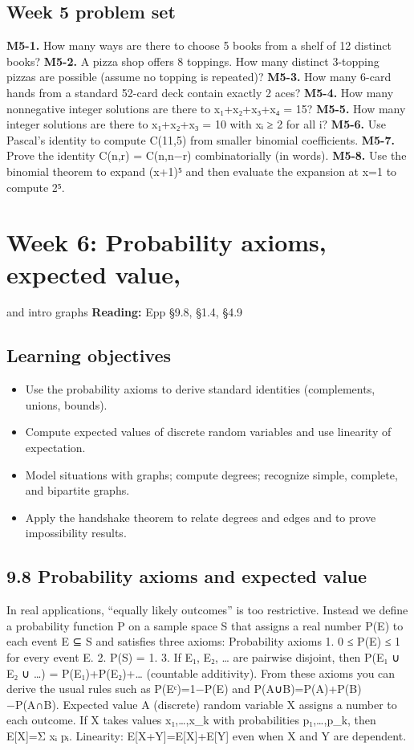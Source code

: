 \documentclass[11pt]{article}
\begin{document}
\subsection*{Week 5 problem set}
\textbf{M5-1.} How many ways are there to choose 5 books from a shelf of 12 distinct books?
\textbf{M5-2.} A pizza shop offers 8 toppings. How many distinct 3-topping pizzas are possible
(assume no topping is repeated)?
\textbf{M5-3.} How many 6-card hands from a standard 52-card deck contain exactly 2 aces?
\textbf{M5-4.} How many nonnegative integer solutions are there to x₁+x₂+x₃+x₄ = 15?
\textbf{M5-5.} How many integer solutions are there to x₁+x₂+x₃ = 10 with xᵢ ≥ 2 for all i?
\textbf{M5-6.} Use Pascal’s identity to compute C(11,5) from smaller binomial coefficients.
\textbf{M5-7.} Prove the identity C(n,r) = C(n,n−r) combinatorially (in words).
\textbf{M5-8.} Use the binomial theorem to expand (x+1)⁵ and then evaluate the expansion at
x=1 to compute 2⁵.

\clearpage
\section{Week 6: Probability axioms, expected value,}
and intro graphs
\textbf{Reading:} Epp §9.8, §1.4, §4.9
\subsection*{Learning objectives}
\begin{itemize}[leftmargin=*,itemsep=0.25em]
\item Use the probability axioms to derive standard identities (complements, unions, bounds).
\item Compute expected values of discrete random variables and use linearity of expectation.
\item Model situations with graphs; compute degrees; recognize simple, complete, and bipartite graphs.
\item Apply the handshake theorem to relate degrees and edges and to prove impossibility results.
\end{itemize}
\subsection{9.8 Probability axioms and expected value}
In real applications, “equally likely outcomes” is too restrictive. Instead we define a
probability function P on a sample space S that assigns a real number P(E) to each event E
⊆ S and satisfies three axioms:
Probability axioms
1. 0 ≤ P(E) ≤ 1 for every event E.
2. P(S) = 1.
3. If E₁, E₂, … are pairwise disjoint, then P(E₁ ∪ E₂ ∪ …) = P(E₁)+P(E₂)+… (countable
additivity).
From these axioms you can derive the usual rules such as P(Eᶜ)=1−P(E) and
P(A∪B)=P(A)+P(B)−P(A∩B).
Expected value
A (discrete) random variable X assigns a number to each outcome.
If X takes values x₁,…,x\_k with probabilities p₁,…,p\_k, then E[X]=Σ xᵢ pᵢ.
Linearity: E[X+Y]=E[X]+E[Y] even when X and Y are dependent.
\end{document}
